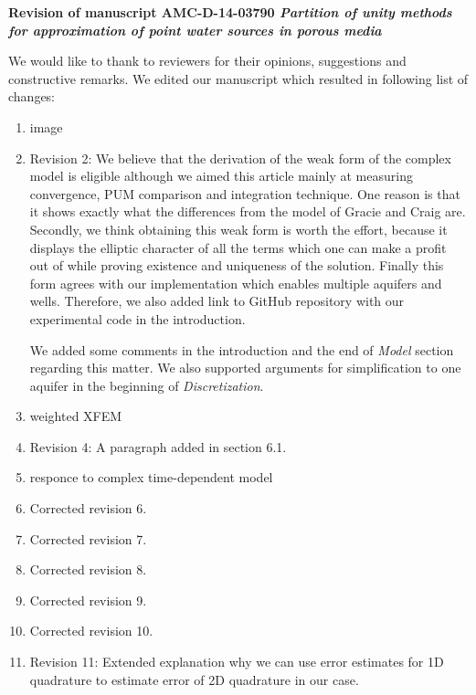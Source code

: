 \documentclass[a4paper,11pt]{article}
\begin{document}
{
\begin{center}
{\Large\bf Revision of manuscript AMC-D-14-03790 
\newline
\newline
\emph{Partition of unity methods for approximation of point water sources in porous media}}
\end{center}
}

We would like to thank to reviewers for their opinions, suggestions and constructive remarks.
We edited our manuscript which resulted in following list of changes:

\begin{enumerate}
\item image %
\item Revision 2: %
      We believe that the derivation of the weak form of the complex model is eligible
      although we aimed this article mainly at measuring convergence, PUM comparison and integration technique.
      One reason is that it shows exactly what the differences from the model of Gracie and Craig are.
      Secondly, we think obtaining this weak form is worth the effort, because it displays the elliptic
      character of all the terms which one can make a profit out of while proving existence and uniqueness of the solution.
      Finally this form agrees with our implementation which enables multiple aquifers and wells.
      Therefore, we also added link to GitHub repository with our experimental code in the introduction.
      
      We added some comments in the introduction and the end of \emph{Model} section regarding this matter.
      We also supported arguments for simplification to one aquifer in the beginning of \emph{Discretization}.
\item weighted XFEM %
\item Revision 4: A paragraph added in section 6.1.%
\item responce to complex time-dependent model %

\item Corrected revision 6. %
\item Corrected revision 7. %
\item Corrected revision 8. %
\item Corrected revision 9. %
\item Corrected revision 10. %

\item Revision 11: Extended explanation why we can use error estimates for 1D quadrature to estimate error of 2D quadrature in our case. %


\end{enumerate}
\end{document}

